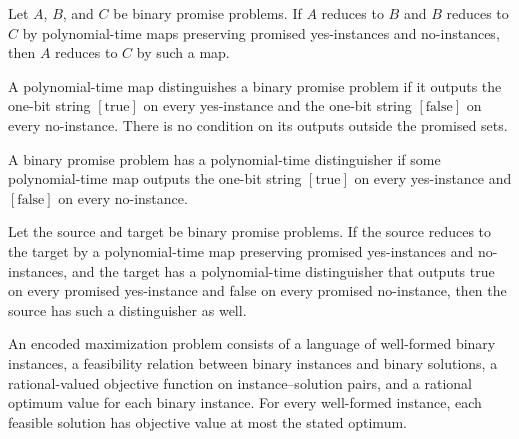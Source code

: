 \begin{theorem}
\label{FABL.PromiseKarpReducible.trans}
\leanok
{}
Let $A$, $B$, and $C$ be binary promise problems. If $A$ reduces to $B$ and $B$ reduces
to $C$ by polynomial-time maps preserving promised yes-instances and no-instances, then
$A$ reduces to $C$ by such a map.
\end{theorem}

\begin{definition}
\label{FABL.PolytimeMap.DistinguishesPromise}
\leanok
{}
A polynomial-time map distinguishes a binary promise problem if it outputs the one-bit
string $[\mathrm{true}]$ on every yes-instance and the one-bit string $[\mathrm{false}]$
on every no-instance. There is no condition on its outputs outside the promised sets.
\end{definition}

\begin{definition}
\label{FABL.HasPolytimeDistinguisher}
\leanok
{}
A binary promise problem has a polynomial-time distinguisher if some polynomial-time map
outputs the one-bit string $[\mathrm{true}]$ on every yes-instance and
$[\mathrm{false}]$ on every no-instance.
\end{definition}

\begin{theorem}
\label{FABL.PromiseKarpReducible.hasPolytimeDistinguisher}
\leanok
{}
Let the source and target be binary promise problems. If the source reduces to the
target by a polynomial-time map preserving promised yes-instances and no-instances, and
the target has a polynomial-time distinguisher that outputs true on every promised
yes-instance and false on every promised no-instance, then the source has such a
distinguisher as well.
\end{theorem}

\begin{definition}
\label{FABL.EncodedMaximizationProblem}
\leanok
An encoded maximization problem consists of a language of well-formed binary instances,
a feasibility relation between binary instances and binary solutions, a rational-valued
objective function on instance–solution pairs, and a rational optimum value for each
binary instance. For every well-formed instance, each feasible solution has objective
value at most the stated optimum.
\end{definition}

